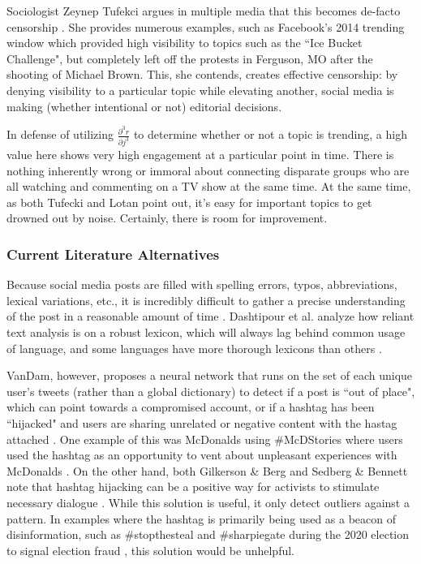 \documentclass[preprint,review,12pt]{elsarticle}
\begin{document}
Sociologist Zeynep Tufekci argues in multiple media that this becomes de-facto censorship \cite{tufekci2017twitter,tufecki2018democracy,tufekci2017we,tufekci2014online}. She provides numerous examples, such as Facebook's 2014 trending window which provided high visibility to topics such as the ``Ice Bucket Challenge", but completely left off the protests in Ferguson, MO after the shooting of Michael Brown. This, she contends, creates effective censorship: by denying visibility to a particular topic while elevating another, social media is making (whether intentional or not) editorial decisions. 

In defense of utilizing $\frac{\partial^3 r}{\partial j^3}$ to determine whether or not a topic is trending, a high value here shows very high engagement at a particular point in time. There is nothing inherently wrong or immoral about connecting disparate groups who are all watching and commenting on a TV show at the same time. At the same time, as both Tufecki and Lotan point out, it's easy for important topics to get drowned out by noise. Certainly, there is room for improvement.

\subsubsection{Current Literature Alternatives} 
Because social media posts are filled with spelling errors, typos, abbreviations, lexical variations, etc., it is incredibly difficult to gather a precise understanding of the post in a reasonable amount of time \cite{vandam2019learning,laniado2010making,schubert2014signitrend}. Dashtipour et al. analyze how reliant text analysis is on a robust lexicon, which will always lag behind common usage of language, and some languages have more thorough lexicons than others \cite{dashtipour2016multilingual}.

VanDam, however, proposes a neural network that runs on the set of each unique user's tweets (rather than a global dictionary) to detect if a post is ``out of place", which can point towards a compromised account, or if a hashtag has been ``hijacked" and users are sharing unrelated or negative content with the hastag attached  \cite{vandam2019learning, vandam2016detecting}. One example of this was McDonalds using \#McDStories where users used the hashtag as an opportunity to vent about unpleasant experiences with McDonalds \cite{jain2015hashjacker}. On the other hand, both Gilkerson & Berg and Sedberg & Bennett note that hashtag hijacking can be a positive way for activists to stimulate necessary dialogue \cite{gilkerson2018social,bennett2012logic}. While this solution is useful, it only detect outliers against a pattern. In examples where the hashtag is primarily being used as a beacon of disinformation, such as \#stopthesteal and \#sharpiegate during the 2020 election to signal election fraud \cite{perez2020facebook}, this solution would be unhelpful.
\end{document}
